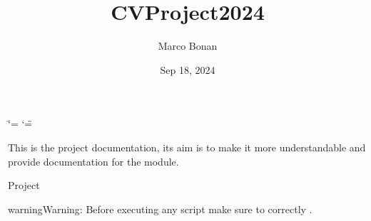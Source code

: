 \documentclass[letterpaper,10pt,english]{sphinxmanual}
\title{CV\sphinxhyphen{}Project\sphinxhyphen{}2024}
\date{Sep 18, 2024}
\author{Marco Bonan}
\begin{document}
\ifdefined\shorthandoff
  \ifnum\catcode`\=\string=\active\shorthandoff{=}\fi
  \ifnum\catcode`\"=\active{}\fi
\fi

\pagestyle{empty}
\sphinxmaketitle
\pagestyle{plain}
\sphinxtableofcontents
\pagestyle{normal}
\label{\detokenize{index::doc}}


\sphinxAtStartPar
This is the project documentation, its aim is to make it more understandable and provide documentation for the  module.

\sphinxAtStartPar
Project 

\begin{sphinxadmonition}{warning}{Warning:}
\sphinxAtStartPar
Before executing any script make sure to correctly {\hyperref[\detokenize{setup:setup}]{}}.
\end{sphinxadmonition}

\sphinxstepscope
\end{document}
